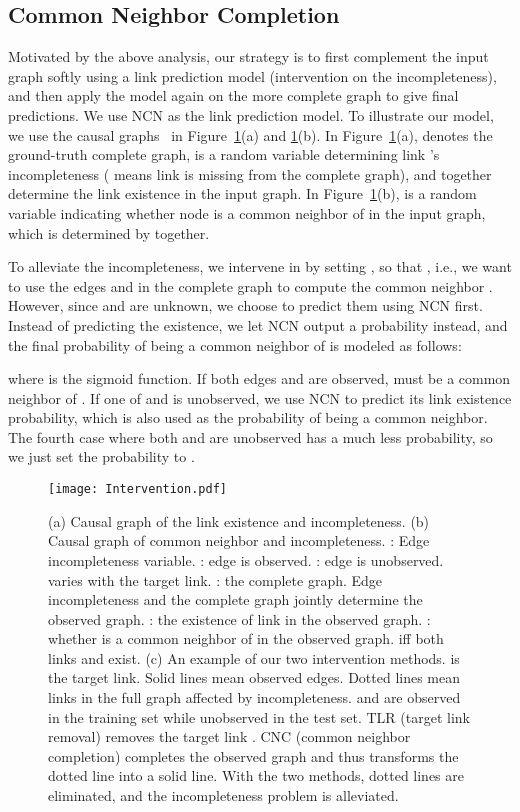 \documentclass{article}
\theoremstyle{plain}
\theoremstyle{definition}
\theoremstyle{remark}
\begin{document}
\subsection{Common Neighbor Completion}\label{sec:CNC} Motivated by the above analysis, our strategy is to first complement the input graph softly using a link prediction model (intervention on the incompleteness), and then apply the model again on the more complete graph to give final predictions. We use NCN as the link prediction model. To illustrate our model, we use the causal graphs~\citep{CausalGraph} in Figure~\ref{fig:causalgraph}(a) and \ref{fig:causalgraph}(b). In Figure~\ref{fig:causalgraph}(a),  denotes the ground-truth complete graph,  is a random variable determining link 's incompleteness ( means link  is missing from the complete graph), and  together determine the link existence  in the input graph. In Figure~\ref{fig:causalgraph}(b),  is a random variable indicating whether node  is a common neighbor of  in the input graph, which is determined by  together. 

To alleviate the incompleteness, we intervene in  by setting , so that , i.e., we want to use the edges  and  in the complete graph to compute the common neighbor . However, since  and  are unknown, we choose to predict them using NCN first. Instead of predicting the existence, we let NCN output a probability instead, and the final probability of  being a common neighbor of  is modeled as follows:

where  is the sigmoid function. If both edges  and  are observed,  must be a common neighbor of . If one of  and  is unobserved, we use NCN to predict its link existence probability, which is also used as the probability of  being a common neighbor. The fourth case where both  and  are unobserved has a much less probability, so we just set the probability to .

\begin{figure}[t]
\vskip 0.0in
    \centering
\texttt{[image: Intervention.pdf]}
\vskip -0.1in
    \caption{
    (a) Causal graph of the link existence and incompleteness.
    (b) Causal graph of common neighbor and incompleteness. : Edge incompleteness variable. : edge is observed. : edge is unobserved.  varies with the target link. : the complete graph. Edge incompleteness and the complete graph jointly determine the observed graph. : the existence of link  in the observed graph. : whether  is a common neighbor of  in the observed graph.  iff both links  and  exist.
    (c) An example of our two intervention methods.  is the target link. Solid lines mean observed edges. Dotted lines mean links in the full graph affected by incompleteness.  and  are observed in the training set while unobserved in the test set. TLR (target link removal) removes the target link . CNC (common neighbor completion) completes the observed graph and thus transforms the dotted line  into a solid line. With the two methods, dotted lines are eliminated, and the incompleteness problem is alleviated.}
    \label{fig:causalgraph}
\vskip -0.2in
\end{figure}
\end{document}

